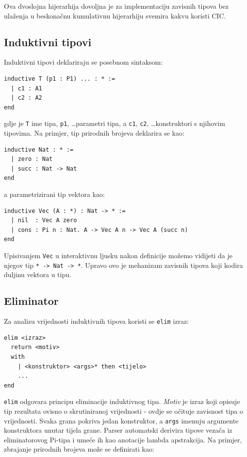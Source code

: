 \documentclass[diplomskirad,upload]{fer}
\begin{document}
Ova dvoslojna hijerarhija dovoljna je za implementaciju zavisnih tipova bez
ulaženja u beskonačnu kumulativnu hijerarhiju svemira kakvu koristi CIC.

\subsection{Induktivni tipovi}

Induktivni tipovi deklariraju se posebnom sintaksom:

\begin{verbatim}
inductive T (p1 : P1) ... : * :=
  | c1 : A1
  | c2 : A2
end
\end{verbatim}

gdje je \texttt{T} ime tipa, \texttt{p1}, \ldots parametri tipa, a
\texttt{c1}, \texttt{c2}, \ldots konstruktori s njihovim tipovima. Na primjer,
tip prirodnih brojeva deklarira se kao:

\begin{verbatim}
inductive Nat : * :=
  | zero : Nat
  | succ : Nat -> Nat
end
\end{verbatim}

a parametrizirani tip vektora kao:

\begin{verbatim}
inductive Vec (A : *) : Nat -> * :=
  | nil  : Vec A zero
  | cons : Pi n : Nat. A -> Vec A n -> Vec A (succ n)
end
\end{verbatim}

Upisivanjem \texttt{Vec} u interaktivnu ljusku nakon definicije možemo vidijeti
da je njegov tip \texttt{* -> Nat -> *}. Upravo ovo je mehanizam zavisnih tipova koji kodira
duljinu vektora u tipu.

\subsection{Eliminator}

Za analizu vrijednosti induktivnih tipova koristi se \texttt{elim} izraz:

\begin{verbatim}
elim <izraz>
  return <motiv>
  with
    | <konstruktor> <args>* then <tijelo>
    ...
end
\end{verbatim}

\texttt{elim} odgovara principu eliminacije induktivnog tipa. \emph{Motiv}
 je izraz koji opisuje tip rezultata ovisno o skrutiniranoj
 vrijednosti - ovdje se očituje zavisnost tipa o vrijednosti.
Svaka grana pokriva jedan konstruktor, a \texttt{args} imenuju
argumente konstruktora unutar tijela grane. Parser automatski derivira tipove
vezača iz eliminatorovog Pi-tipa i umeće ih kao anotacije lambda apstrakcija.
Na primjer, zbrajanje prirodnih brojeva može se definirati kao:
\end{document}
